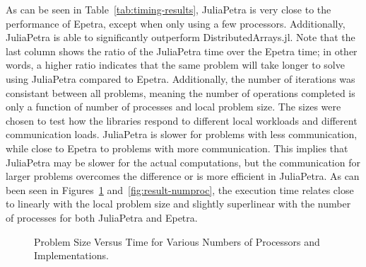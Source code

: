 \documentclass[acmsmall]{acmart}
\begin{document}
	As can be seen in Table~\ref{tab:timing-results}, JuliaPetra is very close to the performance of Epetra, except when only using a few processors.
	Additionally, JuliaPetra is able to significantly outperform DistributedArrays.jl.
	Note that the last column shows the ratio of the JuliaPetra time over the Epetra time; in other words, a higher ratio indicates that the same problem will take longer to solve using JuliaPetra compared to Epetra.
	Additionally, the number of iterations was consistant between all problems, meaning the number of operations completed is only a function of number of processes and local problem size.
	The sizes were chosen to test how the libraries respond to different local workloads and different communication loads.
	JuliaPetra is slower for problems with less communication, while close to Epetra to problems with more communication.
	This implies that JuliaPetra may be slower for the actual computations, but the communication for larger problems overcomes the difference or is more efficient in JuliaPetra.
	As can been seen in Figures~\ref{fig:result-localsize} and~\ref{fig:result-numproc}, the execution time relates close to linearly with the local problem size and slightly superlinear with the number of processes for both JuliaPetra and Epetra.
	
	\begin{figure}
		\caption{Problem Size Versus Time for Various Numbers of Processors and Implementations.}
		\label{fig:result-localsize}
	\end{figure}
	
\end{document}
